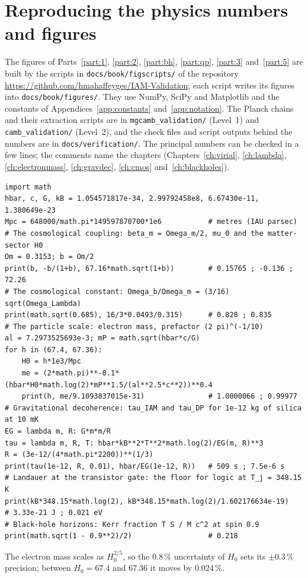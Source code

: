 \chapter{Reproducing the physics numbers and figures}\label{app:repro}

The figures of Parts~\ref{part:1}, \ref{part:2}, \ref{part:bh}, \ref{part:qp}, \ref{part:3} and~\ref{part:5} are built by the scripts in \texttt{docs/\allowbreak book/\allowbreak figscripts/}
of the repository \url{https://github.com/hmahaffeyges/IAM-Validation}; each script writes its figures into \texttt{docs/\allowbreak book/\allowbreak figures/}.
They use NumPy, SciPy and Matplotlib and the constants of Appendices~\ref{app:constants} and~\ref{app:notation}. The Planck chains and their extraction
scripts are in \texttt{mgcamb\_validation/} (Level~1) and \texttt{camb\_validation/} (Level~2), and the check files and script outputs behind the numbers are in
\texttt{docs/\allowbreak verification/}. The principal numbers can be checked in a few lines; the comments name the chapters (Chapters~\ref{ch:virial},
\ref{ch:lambda}, \ref{ch:electronmass}, \ref{ch:gravdec}, \ref{ch:cmos} and~\ref{ch:blackholes}).

\begin{Verbatim}[breaklines,breakanywhere,fontsize=\footnotesize]
import math
hbar, c, G, kB = 1.054571817e-34, 2.99792458e8, 6.67430e-11, 1.380649e-23
Mpc = 648000/math.pi*149597870700*1e6           # metres (IAU parsec)
# The cosmological coupling: beta_m = Omega_m/2, mu_0 and the matter-sector H0
Om = 0.3153; b = Om/2
print(b, -b/(1+b), 67.16*math.sqrt(1+b))        # 0.15765 ; -0.136 ; 72.26
# The cosmological constant: Omega_b/Omega_m = (3/16) sqrt(Omega_Lambda)
print(math.sqrt(0.685), 16/3*0.0493/0.315)      # 0.828 ; 0.835
# The particle scale: electron mass, prefactor (2 pi)^(-1/10)
al = 7.2973525693e-3; mP = math.sqrt(hbar*c/G)
for h in (67.4, 67.36):
    H0 = h*1e3/Mpc
    me = (2*math.pi)**-0.1*(hbar*H0*math.log(2)*mP**1.5/(al**2.5*c**2))**0.4
    print(h, me/9.1093837015e-31)               # 1.0000066 ; 0.99977
# Gravitational decoherence: tau_IAM and tau_DP for 1e-12 kg of silica at 10 mK
EG = lambda m, R: G*m*m/R
tau = lambda m, R, T: hbar*kB**2*T**2*math.log(2)/EG(m, R)**3
R = (3e-12/(4*math.pi*2200))**(1/3)
print(tau(1e-12, R, 0.01), hbar/EG(1e-12, R))   # 509 s ; 7.5e-6 s
# Landauer at the transistor gate: the floor for logic at T_j = 348.15 K
print(kB*348.15*math.log(2), kB*348.15*math.log(2)/1.602176634e-19)   # 3.33e-21 J ; 0.021 eV
# Black-hole horizons: Kerr fraction T S / M c^2 at spin 0.9
print(math.sqrt(1 - 0.9**2)/2)                  # 0.218
\end{Verbatim}

\noindent The electron mass scales as $H_0^{2/5}$, so the $0.8\,\%$ uncertainty of $H_0$ sets its $\pm0.3\,\%$ precision; between $H_0=67.4$ and $67.36$ it moves by
$0.024\,\%$.
